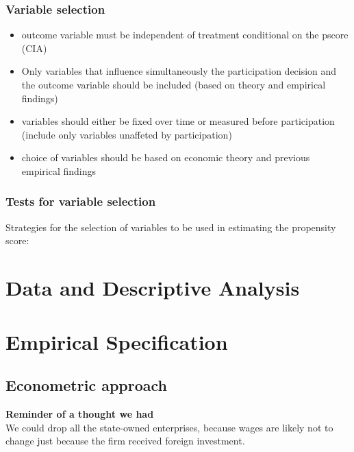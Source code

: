 \documentclass[a4paper,11pt]{scrartcl}
\begin{document}
\subsubsection*{Variable selection}
\begin{itemize}
\item outcome variable must be independent of treatment conditional on the pscore (CIA)
\item Only variables that influence simultaneously the participation decision and the outcome variable should be included (based on theory and empirical findings)
\item variables should either be fixed over time or measured before participation (include only variables unaffeted by participation)
\item choice of variables should be based on economic theory and previous empirical findings
\end{itemize}

\subsubsection*{Tests for variable selection}
Strategies for the selection of variables to be used in estimating the propensity score:



\section{Data and Descriptive Analysis}

\section{Empirical Specification}
\subsection{Econometric approach}
\textbf{Reminder of a thought we had}\\
We could drop all the state-owned enterprises, because wages are likely not to change just because the firm received foreign investment. \\\\
\end{document}
